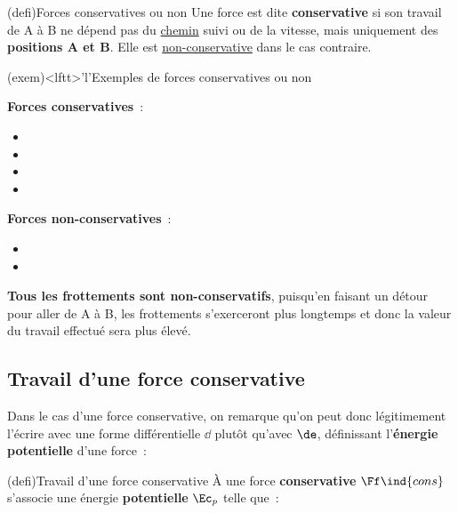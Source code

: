 \documentclass[../../main/main.tex]{subfiles}
\begin{document}
\begin{tcb*}(defi){Forces conservatives ou non}
	Une force est dite \textbf{conservative} si son travail de A à B ne dépend pas du
	\underline{chemin} suivi ou de la vitesse, mais uniquement des
	\textbf{positions A et B}. Elle est \underline{non-conservative} dans le cas
	contraire.
\end{tcb*}

\begin{tcb*}(exem)<lftt>'l'{Exemples de forces conservatives ou non}
	\begin{minipage}{0.45\linewidth}
		\textbf{Forces conservatives}~:
		\begin{itemize}
			\item {}
			\item {}
			\item {}
			\item {}
		\end{itemize}
	\end{minipage}
	\hfill
	\begin{minipage}[b]{0.45\linewidth}
		\textbf{Forces non-conservatives}~:
		\begin{itemize}
			\item {}
			\item {}
		\end{itemize}
	\end{minipage}
	\bigbreak
	\textbf{Tous les frottements sont non-conservatifs}, puisqu'en faisant un
	détour pour aller de A à B, les frottements s'exerceront plus longtemps et
	donc la valeur du travail effectué sera plus élevé.
\end{tcb*}

\subsection{Travail d'une force conservative}
Dans le cas d'une force conservative, on remarque qu'on peut donc légitimement
l'écrire avec une forme différentielle $\dd$ plutôt qu'avec $\de$, définissant
l'\textbf{énergie potentielle} d'une force~:

\begin{tcb*}(defi){Travail d'une force conservative}
	À une force \textbf{conservative} $\Ff\ind{cons}$ s'associe une énergie
	\textbf{potentielle} $\Ec_p$ telle que~:
	\vspace{-15pt}
\end{tcb*}
\end{document}
